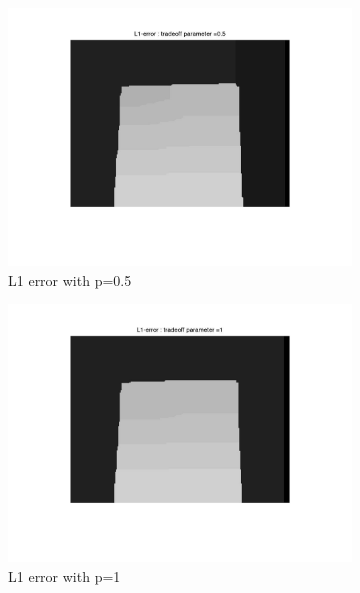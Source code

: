 \documentclass[fleqn]{article}
\begin{document}
\begin{figure}
 \begin{subfigure}{0.5\textwidth}
\includegraphics[scale=0.2]{./pics/map_L1_error_p=0.5.jpg}
\caption{L1 error with p=0.5}
\end{subfigure}
 \begin{subfigure}{0.5\textwidth}
\includegraphics[scale=0.2]{./pics/map_L1_error_p=1.jpg}
\caption{L1 error with p=1}
\end{subfigure}
 \begin{subfigure}{0.5\textwidth}

\end{subfigure}
\end{figure}
\end{document}
